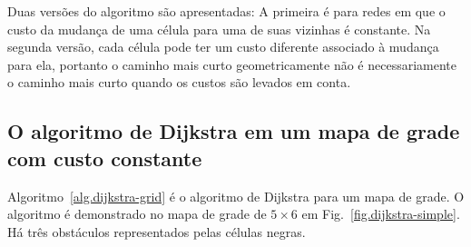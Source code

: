{%

Duas versões do algoritmo são apresentadas: A primeira é para redes em que o custo da mudança de uma célula para uma de suas vizinhas é constante. Na segunda versão, cada célula pode ter um custo diferente associado à mudança para ela, portanto o caminho mais curto geometricamente não é necessariamente o caminho mais curto quando os custos são levados em conta.

\subsection{O algoritmo de Dijkstra em um mapa de grade com custo constante}

Algoritmo~\ref{alg.dijkstra-grid} é o algoritmo de Dijkstra para um mapa de grade. O algoritmo é demonstrado no mapa de grade de $5 \times 6$ em Fig.~\ref{fig.dijkstra-simple}. Há três obstáculos representados pelas células negras.

}
